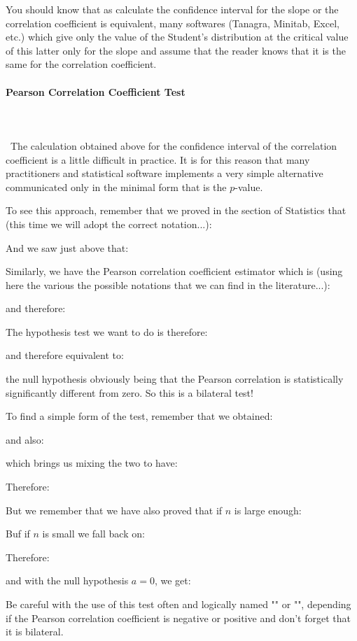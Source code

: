 	You should know that as calculate the confidence interval for the slope or the correlation coefficient is equivalent, many softwares (Tanagra, Minitab, Excel, etc.) which give only the value of the Student's distribution at the critical value of this latter only for the slope and assume that the reader knows that it is the same for the correlation coefficient.
	
	\paragraph{Pearson Correlation Coefficient Test}\mbox{}\\\\\
	The calculation obtained above for the confidence interval of the correlation coefficient is a little difficult in practice. It is for this reason that many practitioners and statistical software implements a very simple alternative communicated only in the minimal form that is the $p$-value.
	
	To see this approach, remember that we proved in the section of Statistics that (this time we will adopt the correct notation...):
	
	And we saw just above that:
	
	Similarly, we have the Pearson correlation coefficient estimator which is (using here the various the possible notations that we can find in the literature...):
	
	and therefore:
	
	The hypothesis test we want to do is therefore:
	
	and therefore equivalent to:
	
	the null hypothesis obviously being that the Pearson correlation is statistically significantly different from zero. So this is a bilateral test!
	
	To find a simple form of the test, remember that we obtained:
	
	and also:
	
	which brings us mixing the two to have:
	
	Therefore:
	
	But we remember that we have also proved that if $n$ is large enough:
	
	Buf if $n$ is small we fall back on:
	
	Therefore:
	
	and with the null hypothesis $a=0$, we get:
	
	
	Be careful with the use of this test often and logically named "" or "", depending if the Pearson correlation coefficient is negative or positive and don't forget that it is bilateral.
	
